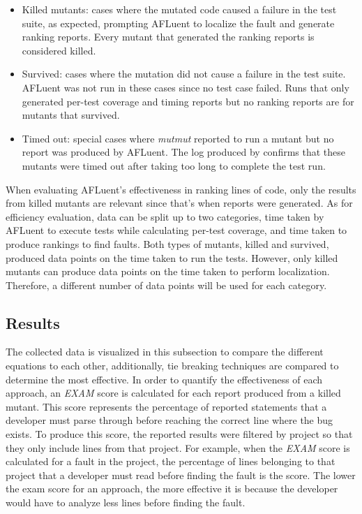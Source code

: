 \begin{itemize}
    \item Killed mutants: cases where the mutated code caused a failure in the
    test suite, as expected, prompting AFLuent to localize the fault and
    generate ranking reports.
    Every mutant that generated the ranking reports is
    considered killed.
    \item Survived: cases where the mutation did not cause a failure in the test
    suite. AFLuent was not run in these cases since no test case failed. Runs
    that only generated per-test coverage and timing reports but no ranking reports
    are for mutants that survived.
    \item Timed out: special cases where \emph{mutmut} reported to run a mutant
    but no report was produced by AFLuent. The log produced by 
    confirms that these mutants were timed out after taking too long to complete
    the test run.
\end{itemize}

When evaluating AFLuent's effectiveness in ranking lines of code, only the
results from killed mutants are relevant since that's when reports were
generated. As for efficiency evaluation, data can be split up to two categories,
time taken by AFLuent to execute tests while calculating per-test coverage, and
time taken to produce rankings to find faults. Both types of mutants, killed and
survived, produced data points on the time taken to run the tests. However, only
killed mutants can produce data points on the time taken to perform
localization. Therefore, a different number of data points will be used for each
category.

\subsection{Results}
\label{subsec:eval_results}

The collected data is visualized in this subsection to compare the different
equations to each other, additionally, tie breaking techniques are compared to
determine the most effective. In order to quantify the effectiveness of each
approach, an \emph{EXAM} \cite{exam_scores}
score is calculated for each report produced from a killed mutant. This score
represents the percentage of reported statements that a developer must parse
through before reaching the correct line where the bug exists. To produce this
score, the reported results were filtered by project so that they
only include lines from that project. For example, when the \emph{EXAM}
score is calculated for a fault in the  project, the
percentage of lines belonging to that project that a developer must read before
finding the fault is the score. The lower the exam score for an approach, the
more effective it is because the developer would have to analyze less lines
before finding the fault.

